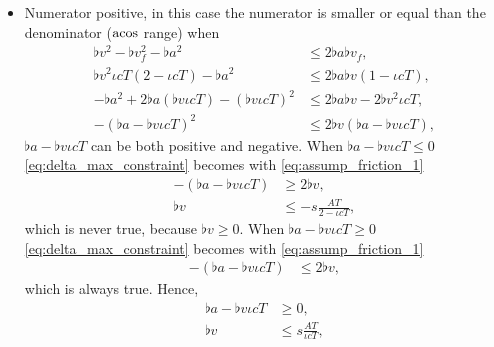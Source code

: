 \begin{itemize}
\item
Numerator positive, in this case the numerator is smaller or equal than the denominator ($\operatorname{acos}$ range) when
\begin{align}
\nonumber
\flat{v}^2 - \flat{v}_f^2 - \flat{a}^2 &\le 2 \flat{a} \flat{v}_f,\\
\nonumber
\flat{v}^2 \iota cT (2 - \iota cT) - \flat{a}^2 &\le 2 \flat{a} \flat{v} (1 - \iota cT),\\
\nonumber
- \flat{a}^2 + 2 \flat{a} (\flat{v} \iota cT) - (\flat{v} \iota cT)^2 &\le 2 \flat{a} \flat{v} - 2 \flat{v}^2 \iota cT,\\
\label{eq:delta_max_constraint}
-(\flat{a} - \flat{v} \iota cT)^2 &\le 2 \flat{v} (\flat{a} - \flat{v} \iota cT),
\end{align}
$\flat{a} - \flat{v} \iota cT$ can be both positive and negative. When $\flat{a} - \flat{v} \iota cT \le 0$ \eqref{eq:delta_max_constraint} becomes with \eqref{eq:assump_friction_1}
\begin{align*}
-(\flat{a} - \flat{v} \iota cT) &\ge 2 \flat{v},\\
\flat{v} &\le -s \frac{AT}{2 - \iota cT},
\end{align*}
which is never true, because $\flat{v} \ge 0$. When $\flat{a} - \flat{v} \iota cT \ge 0$ \eqref{eq:delta_max_constraint} becomes with \eqref{eq:assump_friction_1}
\begin{align*}
-(\flat{a} - \flat{v} \iota cT) &\le 2 \flat{v},
\end{align*}
which is always true. Hence,
\begin{align*}
\flat{a} - \flat{v} \iota cT &\ge 0,\\
\flat{v} &\le s \frac{AT}{\iota cT},
\end{align*}
\end{itemize}

